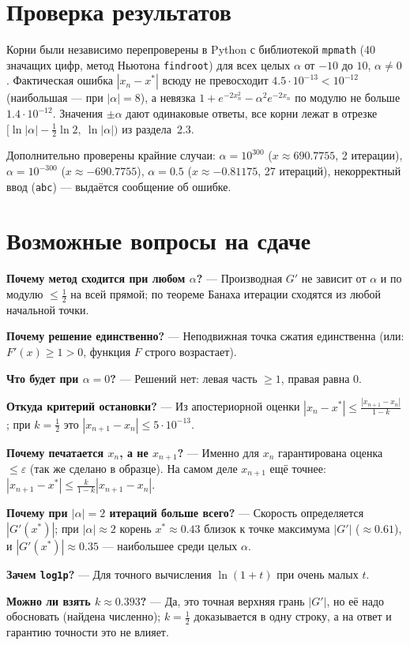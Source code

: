 \documentclass[11pt,a4paper]{article}
\begin{document}
\section{Проверка результатов}
Корни были независимо перепроверены в Python с библиотекой \texttt{mpmath} (40 значащих цифр, метод Ньютона \texttt{findroot}) для всех целых $\alpha$ от $-10$ до $10$, $\alpha\ne0$.
Фактическая ошибка $|x_n-x^*|$ всюду не превосходит $4.5\cdot10^{-13}<10^{-12}$ (наибольшая — при $|\alpha|=8$), а невязка
$1+e^{-2x_n^2}-\alpha^2e^{-2x_n}$ по модулю не больше $1.4\cdot10^{-12}$. Значения $\pm\alpha$ дают одинаковые ответы, все корни лежат в отрезке
$[\ln|\alpha|-\frac12\ln2,\ \ln|\alpha|)$ из раздела~2.3.

Дополнительно проверены крайние случаи: $\alpha=10^{300}$ ($x\approx690.7755$, 2 итерации), $\alpha=10^{-300}$ ($x\approx-690.7755$), $\alpha=0.5$ ($x\approx-0.81175$, 27 итераций), некорректный ввод (\texttt{abc}) — выдаётся сообщение об ошибке.

\section{Возможные вопросы на сдаче}
\begin{qa}
\textbf{Почему метод сходится при любом $\alpha$?} — Производная $G'$ не зависит от $\alpha$ и по модулю $\le\frac12$ на всей прямой; по теореме Банаха итерации сходятся из любой начальной точки.

\textbf{Почему решение единственно?} — Неподвижная точка сжатия единственна (или: $F'(x)\ge1>0$, функция $F$ строго возрастает).

\textbf{Что будет при $\alpha=0$?} — Решений нет: левая часть $\ge1$, правая равна $0$.

\textbf{Откуда критерий остановки?} — Из апостериорной оценки $|x_n-x^*|\le\frac{|x_{n+1}-x_n|}{1-k}$; при $k=\frac12$ это $|x_{n+1}-x_n|\le5\cdot10^{-13}$.

\textbf{Почему печатается $x_n$, а не $x_{n+1}$?} — Именно для $x_n$ гарантирована оценка $\le\varepsilon$ (так же сделано в образце). На самом деле $x_{n+1}$ ещё точнее: $|x_{n+1}-x^*|\le\frac{k}{1-k}|x_{n+1}-x_n|$.

\textbf{Почему при $|\alpha|=2$ итераций больше всего?} — Скорость определяется $|G'(x^*)|$; при $|\alpha|\approx2$ корень $x^*\approx0.43$ близок к точке максимума $|G'|$ ($\approx0.61$), и $|G'(x^*)|\approx0.35$ — наибольшее среди целых $\alpha$.

\textbf{Зачем \texttt{log1p}?} — Для точного вычисления $\ln(1+t)$ при очень малых $t$.

\textbf{Можно ли взять $k\approx0.393$?} — Да, это точная верхняя грань $|G'|$, но её надо обосновать (найдена численно); $k=\frac12$ доказывается в одну строку, а на ответ и гарантию точности это не влияет.
\end{qa}
\end{document}
